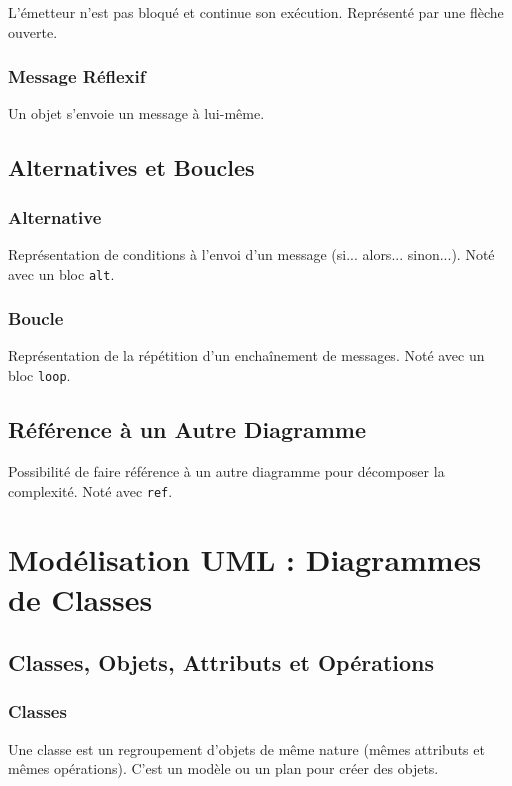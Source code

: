 \documentclass{article}
\begin{document}
\begin{itemize}
L'émetteur n'est pas bloqué et continue son exécution. Représenté par une flèche ouverte.

\subsubsection{Message Réflexif}

Un objet s'envoie un message à lui-même.

\subsection{Alternatives et Boucles}

\subsubsection{Alternative}

Représentation de conditions à l'envoi d'un message (si... alors... sinon...). Noté avec un bloc \texttt{alt}.

\subsubsection{Boucle}

Représentation de la répétition d'un enchaînement de messages. Noté avec un bloc \texttt{loop}.

\subsection{Référence à un Autre Diagramme}

Possibilité de faire référence à un autre diagramme pour décomposer la complexité. Noté avec \texttt{ref}.

\section{Modélisation UML : Diagrammes de Classes}

\subsection{Classes, Objets, Attributs et Opérations}

\subsubsection{Classes}

Une classe est un regroupement d'objets de même nature (mêmes attributs et mêmes opérations). C'est un modèle ou un plan pour créer des objets.


\end{itemize}
\end{document}
